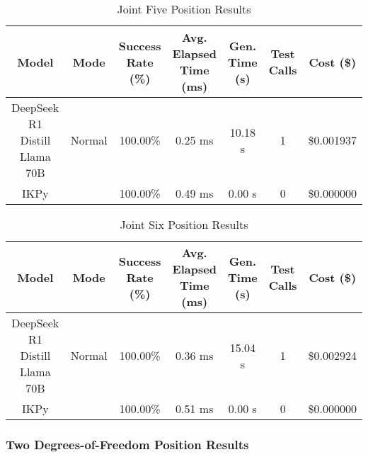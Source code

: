 \begin{table}[H]
\tiny
\renewcommand{\arraystretch}{1.2}
\caption{Joint Five Position Results}
\begin{center}
\begin{tabular}{|c|c|c|c|c|c|c|}
    \hline
    \textbf{Model} & 
    \textbf{Mode} & 
    \makecell{\textbf{Success}\\\textbf{Rate (\%)}} &
    \makecell{\textbf{Avg. Elapsed}\\\textbf{Time (ms)}} &
    \makecell{\textbf{Gen.}\\\textbf{Time (s)}} &
    \makecell{\textbf{Test}\\\textbf{Calls}} &
    \textbf{Cost (\$)} \\
    \hline
    DeepSeek R1 Distill Llama 70B & Normal & 100.00\% & 0.25 ms & 10.18 s & 1 & \$0.001937 \\
    \hline
    IKPy &  & 100.00\% & 0.49 ms & 0.00 s & 0 & \$0.000000 \\
    \hline
\end{tabular}
\label{Results-Position-5-5}
\end{center}
\end{table}

\begin{table}[H]
\tiny
\renewcommand{\arraystretch}{1.2}
\caption{Joint Six Position Results}
\begin{center}
\begin{tabular}{|c|c|c|c|c|c|c|}
    \hline
    \textbf{Model} & 
    \textbf{Mode} & 
    \makecell{\textbf{Success}\\\textbf{Rate (\%)}} &
    \makecell{\textbf{Avg. Elapsed}\\\textbf{Time (ms)}} &
    \makecell{\textbf{Gen.}\\\textbf{Time (s)}} &
    \makecell{\textbf{Test}\\\textbf{Calls}} &
    \textbf{Cost (\$)} \\
    \hline
    DeepSeek R1 Distill Llama 70B & Normal & 100.00\% & 0.36 ms & 15.04 s & 1 & \$0.002924 \\
    \hline
    IKPy &  & 100.00\% & 0.51 ms & 0.00 s & 0 & \$0.000000 \\
    \hline
\end{tabular}
\label{Results-Position-6-6}
\end{center}
\end{table}

\subsubsection{Two Degrees-of-Freedom Position Results}

